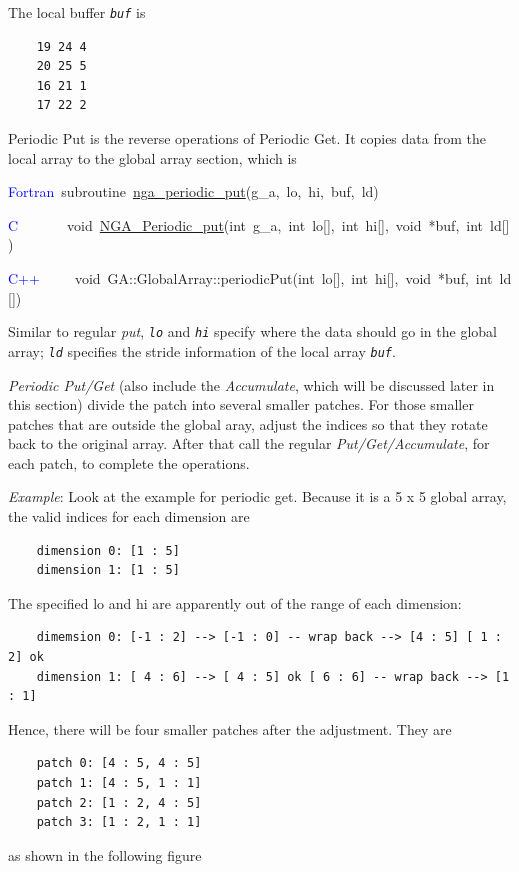 The local buffer \texttt{\emph{buf}} is
\begin{verbatim}
    19 24 4
    20 25 5
    16 21 1
    17 22 2
\end{verbatim}
Periodic Put is the reverse operations of Periodic Get. It copies
data from the local array to the global array section, which is

\textcolor{blue}{Fortran}~subroutine~\href{https://hpc.pnl.gov/globalarrays/api/f_op_api.html\#nga_periodic_put}{nga\_{}periodic\_{}put}(g\_a,~lo,~hi,~buf,~ld)~

\textcolor{blue}{C}~~~~~~~void~\href{https://hpc.pnl.gov/globalarrays/api/c_op_api.html\#nga_periodic_put}{NGA\_{}Periodic\_{}put}(int~g\_a,~int~lo{[}{]},~int~hi{[}{]},~void~{*}buf,~int~ld{[}{]})~

\textcolor{blue}{C++}~~~~~void~GA::GlobalArray::periodicPut(int~lo{[}{]},~int~hi{[}{]},~void~{*}buf,~int~ld{[}{]})

Similar to regular\emph{ put}, \texttt{\emph{lo}} and \texttt{\emph{hi}}
specify where the data should go in the global array; \texttt{\emph{ld}}
specifies the stride information of the local array \texttt{\emph{buf}}.

\emph{Periodic Put/Get} (also include the \emph{Accumulate}, which
will be discussed later in this section) divide the patch into several
smaller patches. For those smaller patches that are outside the global
aray, adjust the indices so that they rotate back to the original
array. After that call the regular \emph{Put/Get/Accumulate}, for
each patch, to complete the operations.

\emph{Example}: Look at the example for periodic get. Because it is
a 5 x 5 global array, the valid indices for each dimension are
\begin{verbatim}
    dimension 0: [1 : 5]
    dimension 1: [1 : 5]
\end{verbatim}
The specified lo and hi are apparently out of the range of each dimension:
\begin{verbatim}
    dimemsion 0: [-1 : 2] --> [-1 : 0] -- wrap back --> [4 : 5] [ 1 : 2] ok
    dimension 1: [ 4 : 6] --> [ 4 : 5] ok [ 6 : 6] -- wrap back --> [1 : 1]
\end{verbatim}
Hence, there will be four smaller patches after the adjustment. They
are
\begin{verbatim}
    patch 0: [4 : 5, 4 : 5]
    patch 1: [4 : 5, 1 : 1]
    patch 2: [1 : 2, 4 : 5]
    patch 3: [1 : 2, 1 : 1]
\end{verbatim}
as shown in the following figure


